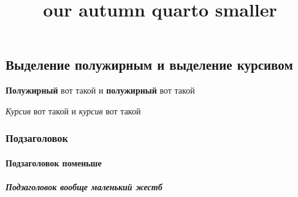 \documentclass[
  letterpaper,
  DIV=11,
  numbers=noendperiod]{scrartcl}
\title{our autumn quarto smaller}
\author{}
\date{}
\let\oldparagraph\paragraph
\renewcommand{\paragraph}[1]{\oldparagraph{#1}\mbox{}}
\let\oldsubparagraph\subparagraph
\renewcommand{\subparagraph}[1]{\oldsubparagraph{#1}\mbox{}}
\begin{document}
\maketitle
\ifdefined\Shaded\renewenvironment{Shaded}{\begin{tcolorbox}[frame hidden, interior hidden, borderline west={3pt}{0pt}{shadecolor}, enhanced, boxrule=0pt, breakable, sharp corners]}{\end{tcolorbox}}\fi

\hypertarget{ux432ux44bux434ux435ux43bux435ux43dux438ux435-ux43fux43eux43bux443ux436ux438ux440ux43dux44bux43c-ux438-ux432ux44bux434ux435ux43bux435ux43dux438ux435-ux43aux443ux440ux441ux438ux432ux43eux43c}{%
\subsection{Выделение полужирным и выделение
курсивом}\label{ux432ux44bux434ux435ux43bux435ux43dux438ux435-ux43fux43eux43bux443ux436ux438ux440ux43dux44bux43c-ux438-ux432ux44bux434ux435ux43bux435ux43dux438ux435-ux43aux443ux440ux441ux438ux432ux43eux43c}}

\textbf{Полужирный} вот такой и \textbf{полужирный} вот такой

\emph{Курсив} вот такой и \emph{курсив} вот такой

\hypertarget{ux43fux43eux434ux437ux430ux433ux43eux43bux43eux432ux43eux43a}{%
\subsubsection{Подзаголовок}\label{ux43fux43eux434ux437ux430ux433ux43eux43bux43eux432ux43eux43a}}

\hypertarget{ux43fux43eux434ux437ux430ux433ux43eux43bux43eux432ux43eux43a-ux43fux43eux43cux435ux43dux44cux448ux435}{%
\paragraph{Подзаголовок
поменьше}\label{ux43fux43eux434ux437ux430ux433ux43eux43bux43eux432ux43eux43a-ux43fux43eux43cux435ux43dux44cux448ux435}}

\hypertarget{ux43fux43eux434ux437ux430ux433ux43eux43bux43eux432ux43eux43a-ux432ux43eux43eux431ux449ux435-ux43cux430ux43bux435ux43dux44cux43aux438ux439-ux436ux435ux441ux442ux431}{%
\subparagraph{Подзаголовок вообще маленький
жестб}\label{ux43fux43eux434ux437ux430ux433ux43eux43bux43eux432ux43eux43a-ux432ux43eux43eux431ux449ux435-ux43cux430ux43bux435ux43dux44cux43aux438ux439-ux436ux435ux441ux442ux431}}
\end{document}
